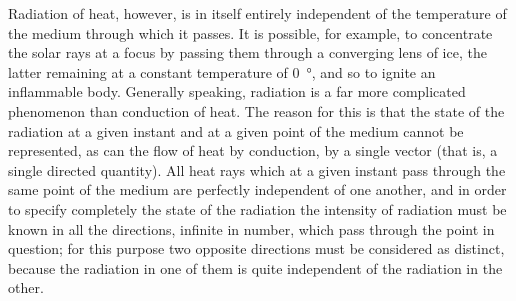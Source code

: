 \documentclass[12pt,oneside]{book}
\begin{document}
Radiation of heat, however, is in itself entirely independent of the temperature of the medium through which it passes. It is possible, for example, to concentrate the solar rays at a focus by passing them through a converging lens of ice, the latter remaining at a constant temperature of \SI{0}{\degree}, and so to ignite an inflammable body. Generally speaking, radiation is a far more complicated phenomenon than conduction of heat. The reason for this is that the state of the radiation at a given instant and at a given point of the medium cannot be represented, as can the flow of heat by conduction, by a single vector (that is, a single directed quantity). All heat rays which at a given instant pass through the same point of the medium are perfectly independent of one another, and in order to specify completely the state of the radiation the intensity of radiation must be known in all the directions, infinite in number, which pass through the point in question; for this purpose two opposite directions must be considered as distinct, because the radiation in one of them is quite independent of the radiation in the other. \par
\end{document}
